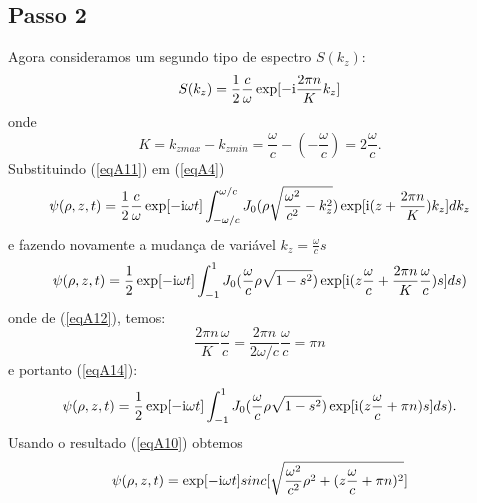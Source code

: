 \subsection{Passo 2}
Agora consideramos um segundo tipo de espectro $S(k_z)$:
\begin{equation}\label{eqA11}
    S(k_{z})=\frac{1}{2}\frac{c}{\omega}\exp[{-\rm i}\frac{2\pi n}{K} k_z]
\end{equation}
onde 
\begin{equation}\label{eqA12}
    K=k_{z max}-k_{z min} = \frac{\omega}{c}-(-\frac{\omega}{c})=2\frac{\omega}{c}.
\end{equation}
Substituindo (\ref{eqA11}) em (\ref{eqA4})
\begin{equation}\label{eqA13}
  \psi(\rho,z,t)=\frac{1}{2}\frac{c}{\omega}\exp[-{\rm i}\omega t]\int_{-\omega/c}^{\omega/c}J_0(\rho\sqrt{\frac{\omega^2}{c^2}-k_{z}^2}) 
\exp[{\rm i}(z+\frac{2\pi n }{K})k_{z}]dk_{z}
\end{equation}
e fazendo novamente a mudança de variável $k_z=\frac{\omega}{c}s$ 
\begin{equation}\label{eqA14}
   \psi(\rho,z,t)=\frac{1}{2}\exp[-{\rm i}\omega t]\int_{-1}^{1}J_0(\frac{\omega}{c}\rho\sqrt{1-s^2})
\exp[{\rm i}(z\frac{\omega}{c}+\frac{2\pi n }{K}\frac{\omega}{c})s]ds) 
\end{equation}
onde de (\ref{eqA12}), temos:
\begin{equation}\label{eqA15}
  \frac{2\pi n}{K}\frac{\omega}{c}=\frac{2\pi n}{2\omega/c}\frac{\omega}{c}= \pi n
\end{equation}
e portanto (\ref{eqA14}):
\begin{equation}\label{eqA16}
   \psi(\rho,z,t)=\frac{1}{2}\exp[-{\rm i}\omega t]\int_{-1}^{1}J_0(\frac{\omega}{c}\rho\sqrt{1-s^2})
\exp[{\rm i}(z\frac{\omega}{c}+\pi n)s]ds). 
\end{equation}
Usando o resultado (\ref{eqA10}) obtemos
\begin{equation}\label{eqA17}
  \psi(\rho,z,t)=\exp[-{\rm i}\omega t]sinc[\sqrt{\frac{\omega^2}{c^2}\rho^2+(z\frac{\omega}{c}+\pi n)^2}] 
\end{equation}
